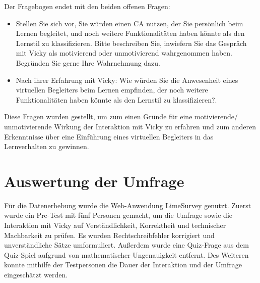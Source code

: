 Der Fragebogen endet mit den beiden offenen Fragen:
\begin{itemize}
    \item \glqq Stellen Sie sich vor, Sie würden einen CA nutzen,
    der Sie persönlich beim Lernen begleitet, und noch weitere Funktionalitäten
    haben könnte als den Lernstil zu klassifizieren.
    Bitte beschreiben Sie, inwiefern Sie das Gespräch mit Vicky als motivierend oder
    unmotivierend wahrgenommen haben. Begründen Sie gerne Ihre Wahrnehmung dazu.\grqq{} 
    \item \glqq Nach ihrer Erfahrung mit Vicky: Wie würden Sie die Anwesenheit 
    eines virtuellen Begleiters beim Lernen empfinden, der noch weitere Funktionalitäten haben 
    könnte als den Lernstil zu klassifizieren?\grqq{}.
\end{itemize} 

Diese Fragen wurden gestellt, um zum einen Gründe für eine motivierende/ unmotivierende Wirkung der 
Interaktion mit Vicky zu erfahren und zum anderen 
Erkenntnisse über eine Einführung eines virtuellen Begleiters 
in das Lernverhalten zu gewinnen.

\section{Auswertung der Umfrage} \label{Kapitel5.2}

Für die Datenerhebung wurde die Web-Anwendung \glqq LimeSurvey\grqq{} genutzt.
Zuerst wurde ein Pre-Test mit fünf Personen gemacht, um die Umfrage sowie die Interaktion mit 
Vicky auf Verständlichkeit, Korrektheit und technischer Machbarkeit zu prüfen.
Es wurden Rechtschreibfehler korrigiert und unverständliche Sätze umformuliert.
Außerdem wurde eine Quiz-Frage aus dem Quiz-Spiel aufgrund von mathematischer Ungenauigkeit 
entfernt. Des Weiteren konnte mithilfe der Testpersonen die Dauer der Interaktion und der Umfrage eingeschätzt werden.

